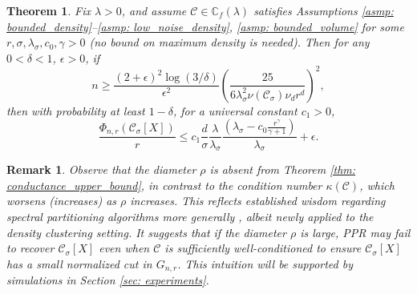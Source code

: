 \documentclass[11pt,twoside]{article}
\newtheorem{theorem}{Theorem}
\newtheorem*{remark}{Remark}
\newcommand{\1}{\mathbf{1}}
\newcommand{\Xbf}{X}             %
\newcommand{\Cbb}{\mathbb{C}}
\newcommand{\Cset}{\mathcal{C}}
\newcommand{\Csig}{\Cset_{\sigma}}
\begin{document}
\begin{theorem}
  \label{thm: conductance_upper_bound}
  Fix $\lambda > 0$, and assume $\Cset \in \Cbb_f(\lambda)$ satisfies
  Assumptions \ref{asmp: bounded_density}--\ref{asmp: low_noise_density}, 
  \ref{asmp: bounded_volume} for some $r, \sigma, \lambda_{\sigma}, c_0, \gamma
  > 0$ (no bound on maximum density is needed). Then for any $0 < \delta < 1$,
  $\epsilon > 0$, if 
  \begin{equation}
    \label{eqn: conductance_sample_complexity}
    n \geq \frac{(2+\epsilon)^2\log(3/\delta)}{\epsilon^2}\left(\frac{25}
      {6 \lambda_{\sigma}^2\nu(\Csig) \nu_d r^d}\right)^2,
  \end{equation}
  then with probability at least $1-\delta$, for a universal constant $c_1 > 0$,
  \begin{equation}
    \label{eqn: conductance_additive_error_bound}
    \frac{\Phi_{n,r}(\Csig[\Xbf])}{r} \leq c_1 \frac{d}{\sigma}
    \frac{\lambda}{\lambda_{\sigma}} \frac{(\lambda_{\sigma} -
      c_0\frac{r^{\gamma}}{\gamma+1})}{\lambda_{\sigma}} + \epsilon.
  \end{equation}
\end{theorem}

\begin{remark}
  \label{rmk: diameter}
  Observe that the diameter $\rho$ is absent from Theorem \ref{thm:
    conductance_upper_bound}, in contrast to the condition number
  $\kappa(\Cset)$, which worsens (increases) as $\rho$ increases. This
  reflects established wisdom regarding spectral partitioning
  algorithms more generally \citep{guattery1995, hein2010}, albeit newly applied
  to the density clustering setting. It suggests that if the diameter $\rho$ is
  large, PPR may fail to recover $\Csig[\Xbf]$ even when $\Cset$ is
  sufficiently well-conditioned to ensure $\Csig[\Xbf]$ has a small normalized
  cut in $G_{n,r}$. This intuition will be supported by simulations in Section
  \ref{sec: experiments}. 
\end{remark}
\end{document}
